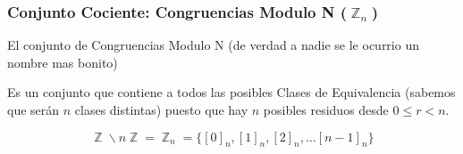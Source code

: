\documentclass[12pt]{report}                                    %
\DeclareMathOperator \Integers  {\mathbb{Z}}                     %
\begin{document}
            \subsubsection*{Conjunto Cociente: Congruencias Modulo N ($\Integers_n$)}

                El conjunto de Congruencias Modulo N (de verdad a nadie se le ocurrio 
                un nombre mas bonito)  

                Es  un conjunto que contiene a todos las posibles Clases de Equivalencia
                (sabemos que serán $n$ clases distintas) puesto que hay $n$ posibles residuos
                desde $0 \leq r < n$.

                \begin{equation}
                    \Integers \backslash n \Integers = 
                        \Integers_n = \{ [0]_n , [1]_n, [2]_n, \dots  [n-1]_n\}
                \end{equation}










       
\end{document}
